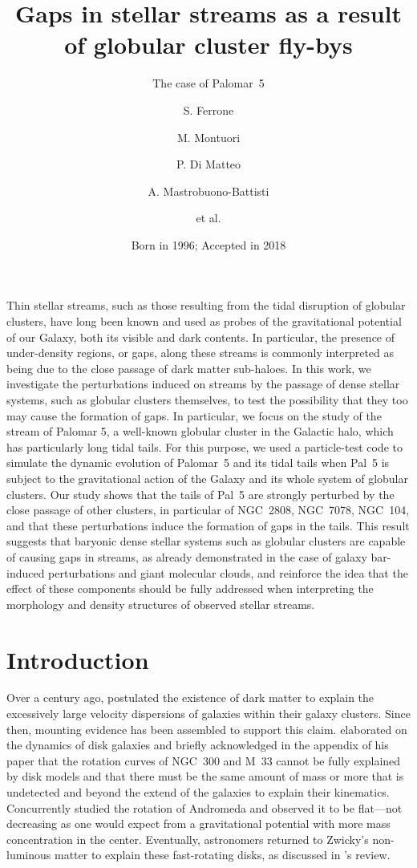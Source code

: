 \documentclass[draft]{aa}
\title{Gaps in stellar streams as a result of globular cluster fly-bys}
\subtitle{The case of Palomar~5}
\author{S. Ferrone
       \inst{1,2}
         \and
       M. Montuori\inst{1}
       \and
       P. Di Matteo\inst{2}
       \and
       A. Mastrobuono-Battisti
       \and
       et al.
       }
\institute{Dipartimento di Fisica, Universit\`a di Roma ``La Sapienza'',
           Piazza Aldo Moro\\
           \email{salvatore.ferrone@uniroma1.it}
      \and
          Paris Observatory. Paris Sciences et Lettres\\
          \email{c.ptolemy@hipparch.uheaven.space}
          \thanks{The university of heaven temporarily does not
                  accept e-mails}
          }
\date{Born in 1996; Accepted in 2018}
\begin{document}
\abstract
  {Thin stellar streams, such as those resulting from the tidal disruption of globular clusters, have long been known and used as probes of the gravitational potential of our Galaxy, both its visible and dark contents. In particular, the presence of under-density regions, or gaps, along these streams is commonly interpreted as being due to the close passage of dark matter sub-haloes. }
  {In this work, we investigate the perturbations induced on streams by the passage of dense stellar systems, such as globular clusters themselves, to test the possibility that they too may cause the formation of gaps. In particular, we focus on the study of the stream of Palomar 5, a well-known globular cluster in the Galactic halo, which has particularly long tidal tails.  }
  {For this purpose, we used a particle-test code to simulate the dynamic evolution of Palomar~5 and its tidal tails when Pal~5 is subject to the gravitational action of the Galaxy and its whole system of globular clusters.}
  {Our study shows that the tails of Pal~5 are strongly perturbed by the close passage of other clusters, in particular of NGC~2808, NGC~7078, NGC~104, and that these perturbations induce the formation of gaps in the tails.}
  {This result suggests that baryonic dense stellar systems such as globular clusters are capable of causing gaps in streams, as already demonstrated in the case of galaxy bar-induced perturbations and giant molecular clouds, and reinforce the idea that the effect of these components should be fully addressed when interpreting the morphology and density structures of observed stellar streams.}


\maketitle
\section{Introduction}


  Over a century ago, \citet{1933AcHPh...6..110Z} postulated the existence of dark matter to explain the excessively large velocity dispersions of galaxies within their galaxy clusters. Since then, mounting evidence has been assembled to support this claim. \citet{1970IAUS...38..351F,1970ApJ...161..802F} elaborated on the dynamics of disk galaxies and briefly acknowledged in the appendix of his paper that the rotation curves of NGC~300 and M~33 cannot be fully explained by disk models and that there must be the same amount of mass or more that is undetected and beyond the extend of the galaxies to explain their kinematics. Concurrently \citet{1970ApJ...159..379R} studied the rotation of Andromeda and observed it to be flat---not decreasing as one would expect from a gravitational potential with more mass concentration in the center. Eventually, astronomers returned to Zwicky's non-luminous matter to explain these fast-rotating disks, as discussed in \citet{1983SciAm.248f..96R}'s review.
  
\end{document}

